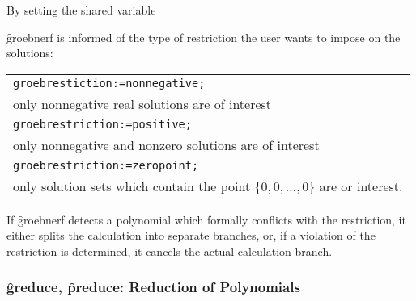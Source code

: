 By setting the shared variable
\hypertarget{reserved:GROEBRESTRICTION}{}
\begin{center}  \end{center}
\f{groebnerf} is informed of the type of restriction the user wants to
impose on the solutions:
\begin{center}
\begin{tabular}{l}
\texttt{groebrestiction:=nonnegative;} \\
\hspace*{+.5cm} only nonnegative real solutions are of
interest\vspace*{4mm} \\
\texttt{groebrestriction:=positive;} \\
\hspace*{+.5cm}only nonnegative and nonzero solutions are of
interest\vspace*{4mm} \\
\texttt{groebrestriction:=zeropoint;} \\
\hspace*{+.5cm}only solution sets which contain the point
$\{0,0,\ldots,0\}$ are or interest.
\end{tabular}
\end{center}

If \f{groebnerf} detects a polynomial which formally conflicts with the
restriction, it either splits the calculation into separate branches, or,
if a violation of the restriction is determined, it cancels the actual
calculation branch.

\subsubsection{\f{greduce}, \f{preduce}: Reduction of Polynomials}

